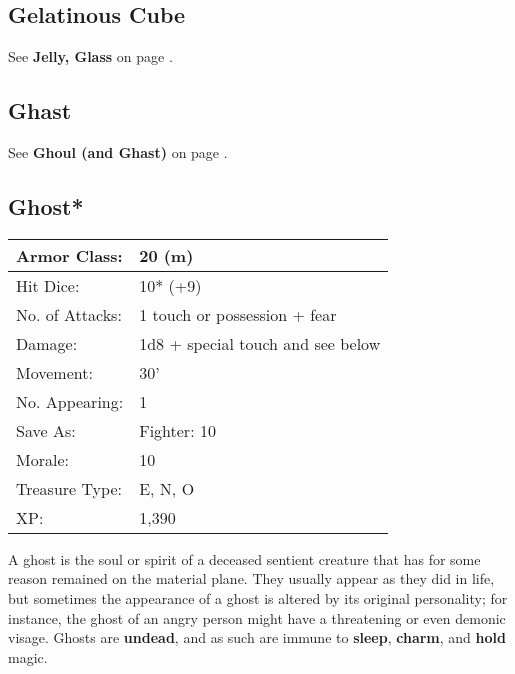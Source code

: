 \documentclass[a4paper,twoside,openany,10pt]{book}
\begin{document}
\pagebreak

\begin{multicols}{2}



\subsection*{Gelatinous Cube}\label{gelatinous-cube}

See \textbf{Jelly, Glass }on page \hyperlink{jelly-glass-gelatinous-cube}{\pageref{jelly-glass-gelatinous-cube}}.

\subsection*{Ghast}\label{ghast}

See \textbf{Ghoul (and Ghast)} on page
\hyperlink{ghoul-and-ghast}{\pageref{ghoul-and-ghast}}.

\subsection*{Ghost*}\label{ghost}

\begin{tabularx}{0.48\textwidth}{@{}lX@{}}
Armor Class: & 20 (m) \\\hline
Hit Dice: & 10* (+9) \\\hline
No. of Attacks: & 1 touch or possession + fear \\\hline
Damage: & 1d8 + special touch and see below \\\hline
Movement: & 30' \\\hline
No. Appearing: & 1 \\\hline
Save As: & Fighter: 10 \\\hline
Morale: & 10 \\\hline
Treasure Type: & E, N, O \\\hline
XP: & 1,390 \\\hline
\end{tabularx}\medskip

A ghost is the soul or spirit of a deceased sentient creature that has for some reason remained on the material plane. They usually appear as they did in life, but sometimes the appearance of a ghost is altered by its original personality; for instance, the ghost of an angry person might have a threatening or even demonic visage. Ghosts are \textbf{undead}, and as such are immune to \textbf{sleep}, \textbf{charm}, and \textbf{hold }magic.


\end{multicols}
\end{document}
